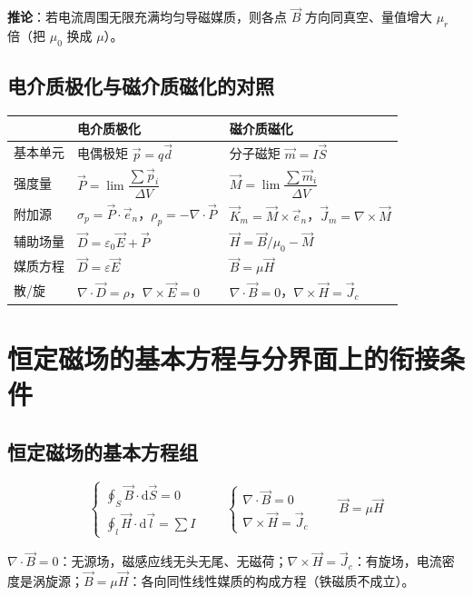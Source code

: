 \textbf{推论}：若电流周围无限充满均匀导磁媒质，则各点 $\vec{B}$ 方向同真空、量值增大 $\mu_r$ 倍（把 $\mu_0$ 换成 $\mu$）。

\subsection{电介质极化与磁介质磁化的对照}
\begin{center}
\small
\begin{tabularx}{\linewidth}{@{}l X X@{}}
\toprule
 & \textbf{电介质极化} & \textbf{磁介质磁化} \\
\midrule
基本单元 & 电偶极矩 $\vec{p}=q\vec{d}$ & 分子磁矩 $\vec{m}=I\vec{S}$ \\
强度量 & $\vec{P}=\lim\dfrac{\sum\vec{p}_i}{\Delta V}$ & $\vec{M}=\lim\dfrac{\sum\vec{m}_i}{\Delta V}$ \\
附加源 & $\sigma_p=\vec{P}\cdot\vec{e}_n$，$\rho_p=-\nabla\cdot\vec{P}$ & $\vec{K}_m=\vec{M}\times\vec{e}_n$，$\vec{J}_m=\nabla\times\vec{M}$ \\
辅助场量 & $\vec{D}=\varepsilon_0\vec{E}+\vec{P}$ & $\vec{H}=\vec{B}/\mu_0-\vec{M}$ \\
媒质方程 & $\vec{D}=\varepsilon\vec{E}$ & $\vec{B}=\mu\vec{H}$ \\
散/旋 & $\nabla\cdot\vec{D}=\rho$，$\nabla\times\vec{E}=0$ & $\nabla\cdot\vec{B}=0$，$\nabla\times\vec{H}=\vec{J}_c$ \\
\bottomrule
\end{tabularx}
\end{center}


\section{恒定磁场的基本方程与分界面上的衔接条件}

\subsection{恒定磁场的基本方程组}
\begin{formulaBox}
\[
\begin{cases}
\displaystyle\oint_S\vec{B}\cdot\mathrm{d}\vec{S}=0\\[6pt]
\displaystyle\oint_l\vec{H}\cdot\mathrm{d}\vec{l}=\sum I
\end{cases}
\qquad
\begin{cases}
\nabla\cdot\vec{B}=0\\[4pt]
\nabla\times\vec{H}=\vec{J}_c
\end{cases}
\qquad
\vec{B}=\mu\vec{H}
\]
\end{formulaBox}
$\nabla\cdot\vec{B}=0$：无源场，磁感应线无头无尾、无磁荷；$\nabla\times\vec{H}=\vec{J}_c$：有旋场，电流密度是涡旋源；$\vec{B}=\mu\vec{H}$：各向同性线性媒质的构成方程（铁磁质不成立）。

